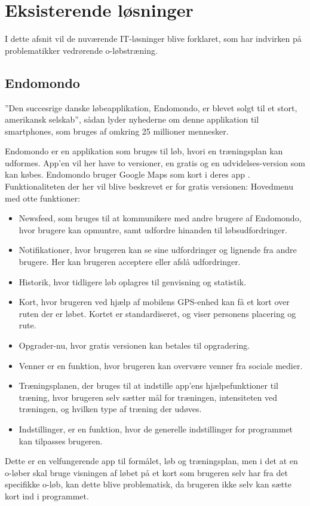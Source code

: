 \chapter{Eksisterende løsninger}
I dette afsnit vil de nuværende IT-løsninger blive forklaret, som har indvirken på problematikker vedrørende o-løbstræning. 

\section{Endomondo}
”Den succesrige danske løbeapplikation, Endomondo, er blevet solgt til et stort, amerikansk selskab”, sådan lyder nyhederne om denne applikation til smartphones, som bruges af omkring 25 millioner mennesker. \citep{ENDO}

Endomondo er en applikation som bruges til løb, hvori en træningsplan kan udformes. App’en vil her have to versioner, en gratis og en udvidelses-version som kan købes. Endomondo bruger Google Maps som kort i deres app \citep{ENDOMAPS}. Funktionaliteten der her vil blive beskrevet er for gratis versionen: Hovedmenu med otte funktioner:
\begin{itemize}
	\item Newsfeed, som bruges til at kommunikere med andre brugere af Endomondo, hvor brugere kan opmuntre, samt udfordre hinanden til løbsudfordringer.
	\item Notifikationer, hvor brugeren kan se sine udfordringer og lignende fra andre brugere. Her kan brugeren acceptere eller afslå udfordringer.
	\item Historik, hvor tidligere løb oplagres til genvisning og statistik.
	\item Kort, hvor brugeren ved hjælp af mobilens GPS-enhed kan få et kort over ruten der er løbet. Kortet er standardiseret, og viser personens placering og rute.
	\item Opgrader-nu, hvor gratis versionen kan betales til opgradering.
	\item Venner er en funktion, hvor brugeren kan overvære venner fra sociale medier.
	\item Træningsplanen, der bruges til at indstille app’ens hjælpefunktioner til træning, hvor brugeren selv sætter mål for træningen, intensiteten ved træningen, og hvilken type af træning der udøves.
	\item Indstillinger, er en funktion, hvor de generelle indstillinger for programmet kan tilpasses brugeren.
\end{itemize}
Dette er en velfungerende app til formålet, løb og træningsplan, men i det at en o-løber skal bruge visningen af løbet på et kort som brugeren selv har fra det specifikke o-løb, kan dette blive problematisk, da brugeren ikke selv kan sætte kort ind i programmet. 


